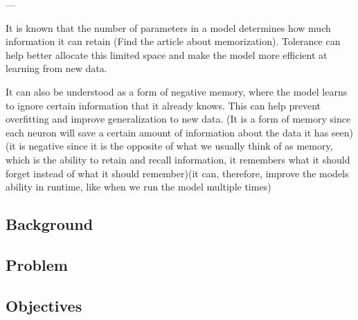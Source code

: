     ---

    It is known that the number of parameters in a model determines how much information it can retain (Find the article about memorization). Tolerance can help better allocate this limited space and make the model more efficient at learning from new data.

    It can also be understood as a form of negative memory, where the model learns to ignore certain information that it already knows. This can help prevent overfitting and improve generalization to new data. (It is a form of memory since each neuron will save a certain amount of information about the data it has seen)(it is negative since it is the opposite of what we usually think of as memory, which is the ability to retain and recall information, it remembers what it should forget instead of what it should remember)(it can, therefore, improve the models ability in runtime, like when we run the model multiple times)

    \subsection{Background}

    \subsection{Problem}

    \subsection{Objectives}
